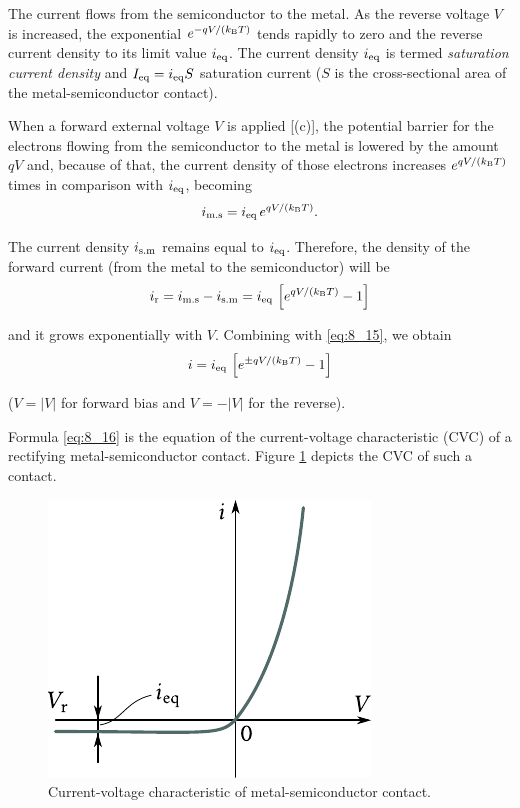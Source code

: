 \noindent
The current flows from the semiconductor to the metal. As the reverse voltage $V$ is increased, the exponential $e^{-qV/(k_{\text{B}}T)}$ tends rapidly to zero and the reverse current density to its limit value $i_{\text{eq}}$. The current density $i_{\text{eq}}$ is termed \textit{saturation current density} and $I_{\text{eq}}=i_{\text{eq}} S$ saturation current ($S$ is the cross-sectional area of the metal-semiconductor contact).

When a forward external voltage $V$ is applied [(c)], the potential barrier for the electrons flowing from the semiconductor to the metal is lowered by the amount $qV$ and, because of that, the current density of those electrons increases $e^{qV/(k_{\text{B}}T)}$ times in comparison with $i_{\text{eq}}$, becoming
\begin{equation*}
    i_{\text{m.s}} = i_{\text{eq}}\, e^{qV/(k_{\text{B}}T)}.
\end{equation*}

The current density $i_{\text{s.m}}$ remains equal to $i_{\text{eq}}$. Therefore, the density of the forward current (from the metal to the semiconductor) will be
\begin{equation}\label{eq:8_15}
    i_{\text{r}} = i_{\text{m.s}} - i_{\text{s.m}} = i_{\text{eq}}\, \left[e^{qV/(k_{\text{B}}T)} - 1\right]
\end{equation}

\noindent
and it grows exponentially with $V$. Combining  with \eqref{eq:8_15}, we obtain
\begin{equation}\label{eq:8_16}
    i = i_{\text{eq}}\, \left[e^{\pm qV/(k_{\text{B}}T)} - 1\right]
\end{equation}

\noindent
($V=|V|$ for forward bias and $V=-|V|$ for the reverse).

Formula \eqref{eq:8_16} is the equation of the current-voltage characteristic (CVC) of a rectifying metal-semiconductor contact. Figure \ref{fig:8_10}
depicts the CVC of such a contact.

\begin{figure}[t]
	\begin{center}
		\includegraphics[scale=1]{figures/ch_08/fig_8_10.pdf}
		\caption[]{Current-voltage characteristic of metal-semiconductor contact.}
		\label{fig:8_10}
	\end{center}
	\vspace{-0.8cm}
\end{figure}


